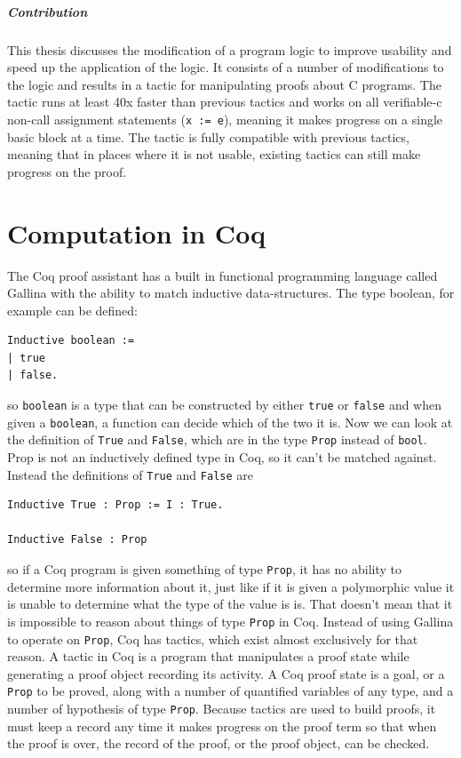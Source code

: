 \documentclass{puthesis}
\begin{document}
\paragraph{Contribution}
This thesis discusses the modification of a program logic to improve
usability and speed up the application of the logic. It consists of a
number of modifications to the logic and results in a tactic for
manipulating proofs about C programs. The tactic runs at least 40x
faster than previous tactics and works on all verifiable-c non-call
assignment statements (\lstinline|x := e|), meaning it makes progress
on a single basic block at a time. The tactic is fully compatible with
previous tactics, meaning that in places where it is not usable,
existing tactics can still make progress on the proof.

\chapter{Computation in Coq}

The Coq proof assistant has a built in functional programming language
called Gallina with the ability to match inductive data-structures. The type
boolean, for example can be defined:

\begin{lstlisting}
Inductive boolean :=
| true
| false.
\end{lstlisting}

so \lstinline|boolean| is a type that can be constructed by either
\lstinline|true| or \lstinline|false| and when given a
\lstinline|boolean|, a function can decide which of the two it is. Now
we can look at the definition of \lstinline|True| and
\lstinline|False|, which are in the type
\lstinline|Prop| instead of \lstinline|bool|. Prop is not an
inductively defined type in Coq, so it can't be matched
against. Instead the definitions of \lstinline|True| and \lstinline|False|
are

\begin{lstlisting}
Inductive True : Prop := I : True.

Inductive False : Prop
\end{lstlisting}

\noindent so if a Coq program is given something of type
\lstinline|Prop|, it has no ability to determine more information
about it, just like if it is given a polymorphic value it is unable to
determine what the type of the value is is. That doesn't mean that it
is impossible to reason about things of type \lstinline|Prop| in
Coq. Instead of using Gallina to operate on \lstinline|Prop|, Coq has
tactics, which exist almost exclusively for that reason. A tactic in
Coq is a program that manipulates a proof state while generating a
proof object recording its activity. A Coq proof state is
a goal, or a \lstinline|Prop| to be proved, along with a number of
quantified variables of any type, and a number of hypothesis of type
\lstinline|Prop|. Because tactics are used to build proofs, it must keep a
record any time it makes progress on the proof term so that when the
proof is over, the record of the proof, or the proof object, can be
checked.
\end{document}
